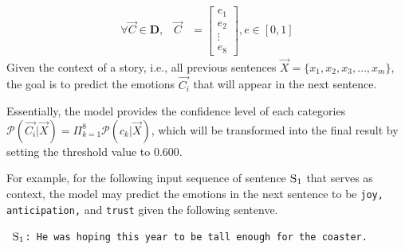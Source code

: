 \documentclass{article} %
\begin{document}
\begin{align}
    \forall \vec{C} \in \mathbf{D}, \hspace{10pt} \vec{C} &= \begin{bmatrix}
                                                e_{1} \\
                                                e_{2} \\
                                                \vdots \\
                                                e_{8}
                                                \end{bmatrix}, 
    e \in [0, 1]
\end{align}
\noindent Given the context of a story, i.e., all previous sentences $\vec{X} = \{x_1, x_2, x_3, \dots, x_m\}$, the goal is to predict the emotions $\vec{C_i}$ that will appear in the next sentence. 


Essentially, the model provides the confidence level of each categories $\mathcal{P}(\vec{C_i} | \vec{X}) = \Pi^8_{k=1}\mathcal{P}(c_k | \vec{X})$, which will be transformed into the final result by setting the threshold value to $0.600$. 

For example, for the following input sequence of sentence $\textsc{S}_1$ that serves as context, the model may predict the emotions in the next sentence to be \texttt{joy, anticipation,} and \texttt{trust} given the following sentenve.

\begin{center}
    \texttt{
    $\textsc{S}_1$: He was hoping this year to be tall enough for the coaster.
    }
\end{center}

    
\end{document}
